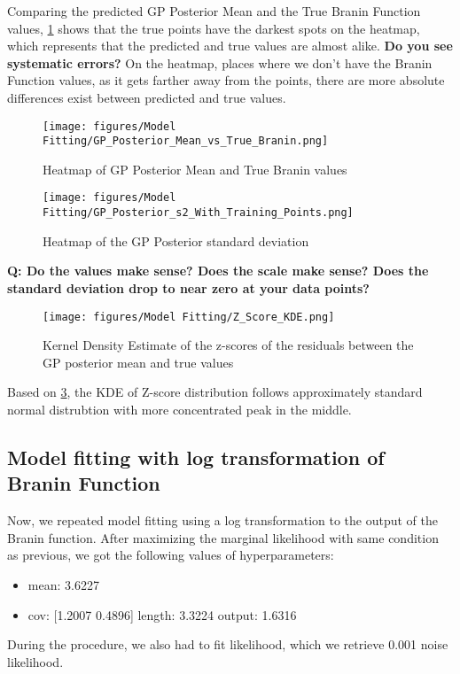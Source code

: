 \documentclass[11pt]{article}
\numberwithin{equation}{section}
\begin{document}
Comparing the predicted GP Posterior Mean and the True Branin Function values, \ref{fig:gp_postmean_and_trueval} shows that the true points have the darkest spots on the heatmap, which represents that the predicted and true values are almost alike. \textbf{Do you see systematic errors?} On the heatmap, places where we don't have the Branin Function values, as it gets farther away from the points, there are more absolute differences exist between predicted and true values.

\begin{figure}[H]
  \centering
  \texttt{[image: figures/Model Fitting/GP\_Posterior\_Mean\_vs\_True\_Branin.png]}
  \caption{Heatmap of GP Posterior Mean and True Branin values}
  \label{fig:gp_postmean_and_trueval}
\end{figure}


\begin{figure}[H]
  \centering
  \texttt{[image: figures/Model Fitting/GP\_Posterior\_s2\_With\_Training\_Points.png]}
  \caption{Heatmap of the GP Posterior standard deviation}
  \label{fig:gp_post_std}
\end{figure}
\textbf{Q: Do the values make sense? Does the scale make sense? Does the standard deviation drop to near zero at your data points?}

\begin{figure}[H]
  \centering
  \texttt{[image: figures/Model Fitting/Z\_Score\_KDE.png]}
  \caption{Kernel Density Estimate of the z-scores of the residuals between the GP posterior mean and true values}
  \label{fig:zscore_kde}
\end{figure}
Based on \ref{fig:zscore_kde}, the KDE of Z-score distribution follows approximately standard normal distrubtion with more concentrated peak in the middle.

\subsection*{Model fitting with log transformation of Branin Function}
Now, we repeated model fitting using a log transformation to the output of the Branin function. After maximizing the marginal likelihood with same condition as previous, we got the following values of hyperparameters:
\begin{itemize}
  \item
    mean: 3.6227
  \item
    cov: [1.2007 0.4896]
    length: 3.3224
    output: 1.6316
\end{itemize}
During the procedure, we also had to fit likelihood, which we retrieve 0.001 noise likelihood.
\end{document}
